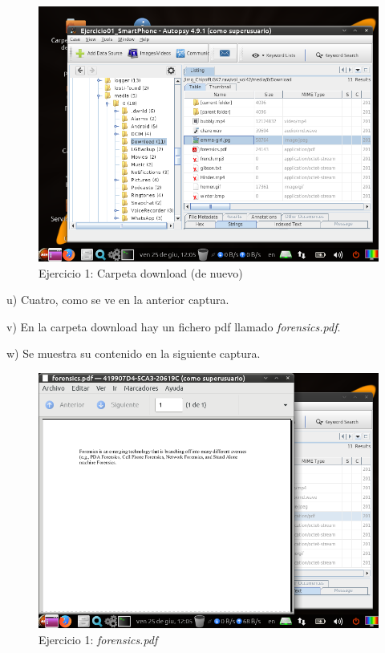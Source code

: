 \documentclass[11pt]{article}
\begin{document}
\begin{figure}[H]
    \caption{Ejercicio 1: Carpeta download (de nuevo)}
    \centering
    \includegraphics[scale=0.7]{e1-21.png}
\end{figure}

u) Cuatro, como se ve en la anterior captura.

v) En la carpeta download hay un fichero pdf llamado \textit{forensics.pdf}.

w) Se muestra su contenido en la siguiente captura.

\begin{figure}[H]
    \caption{Ejercicio 1: \textit{forensics.pdf}}
    \centering
    \includegraphics[scale=0.7]{e1-22.png}
\end{figure}
\end{document}
